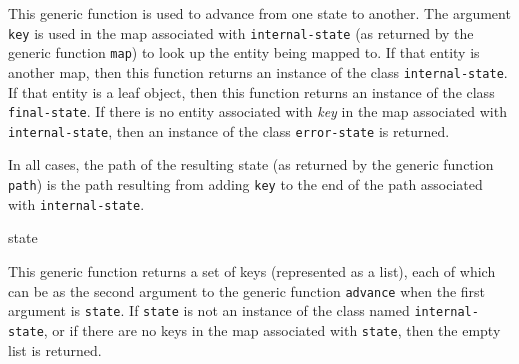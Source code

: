 This generic function is used to advance from one state to another.
The argument \texttt{key} is used in the map associated with
\texttt{internal-state} (as returned by the generic function
\texttt{map}) to look up the entity being mapped to.  If that entity
is another map, then this function returns an instance of the class
\texttt{internal-state}.  If that entity is a leaf object, then this
function returns an instance of the class \texttt{final-state}.  If
there is no entity associated with \emph{key} in the map associated
with \texttt{internal-state}, then an instance of the class
\texttt{error-state} is returned.

In all cases, the path of the resulting state (as returned by the
generic function \texttt{path}) is the path resulting from adding
\texttt{key} to the end of the path associated with
\texttt{internal-state}.

 {state}

This generic function returns a set of keys (represented as a list),
each of which can be as the second argument to the generic function
\texttt{advance} when the first argument is \texttt{state}.  If
\texttt{state} is not an instance of the class named
\texttt{internal-state}, or if there are no keys in the map associated
with \texttt{state}, then the empty list is returned.
